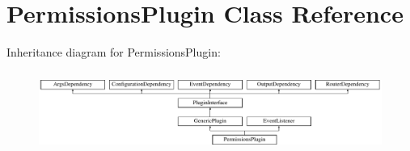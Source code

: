 \hypertarget{classPermissionsPlugin}{\section{Permissions\-Plugin Class Reference}
\label{classPermissionsPlugin}
}
Inheritance diagram for Permissions\-Plugin\-:\begin{figure}[H]
\begin{center}
\leavevmode
\includegraphics[height=2.666667cm]{classPermissionsPlugin}
\end{center}
\end{figure}
